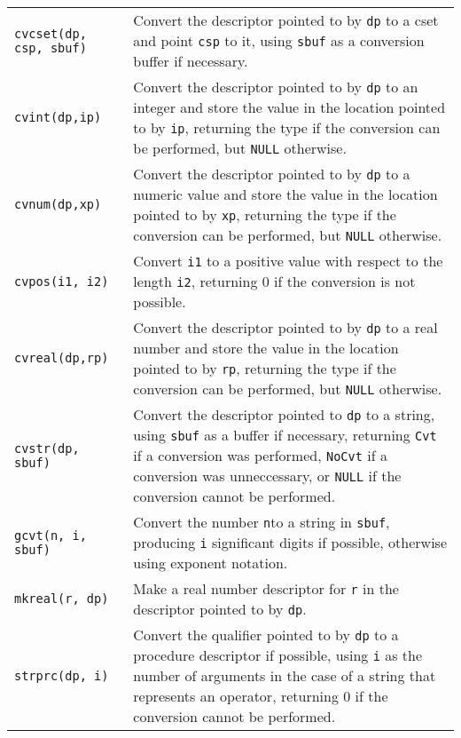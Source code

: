 \begin{xtabular}{l@{\hspace{1cm}}p{11cm}}

\texttt{\color{red}cvcset(dp, csp, sbuf)} &
Convert the descriptor pointed to by \texttt{dp} to a cset and point
\texttt{csp} to it, using \texttt{sbuf} as a conversion buffer if necessary.\\

\texttt{\color{red}cvint(dp,ip)} &
Convert the descriptor pointed to by \texttt{dp} to an integer and store the
value in the location pointed to by \texttt{ip}, returning the type if the
conversion can be performed, but \texttt{NULL} otherwise.\\

\texttt{\color{red}cvnum(dp,xp)} &
Convert the descriptor pointed to by \texttt{dp} to a numeric value and store
the value in the location pointed to by \texttt{xp}, returning the type if the
conversion can be performed, but \texttt{NULL} otherwise.\\

\texttt{cvpos(i1, i2)} &
Convert \texttt{i1} to a positive value with respect to the length \texttt{i2},
returning 0 if the conversion is not possible.\\

\texttt{\color{red}cvreal(dp,rp)} &
Convert the descriptor pointed to by \texttt{dp} to a real number and store
the value in the location pointed to by \texttt{rp}, returning the type if the
conversion can be performed, but \texttt{NULL} otherwise.\\

\texttt{\color{red}cvstr(dp, sbuf)} &
Convert the descriptor pointed to \texttt{dp} to a string, using \texttt{sbuf}
as a buffer if necessary, returning \texttt{Cvt} if a conversion was performed,
\texttt{NoCvt} if a conversion was unneccessary, or \texttt{NULL} if the
conversion cannot be performed.\\

\texttt{\color{red}gcvt(n, i, sbuf)} &
Convert the number \texttt{n}to a string in \texttt{sbuf}, producing \texttt{i}
significant digits if possible, otherwise using exponent notation.\\

\texttt{\color{red}mkreal(r, dp)} &
Make a real number descriptor for \texttt{r} in the descriptor pointed to by
\texttt{dp}.\\

\texttt{strprc(dp, i)} &
Convert the qualifier pointed to by \texttt{dp} to a procedure descriptor if
possible, using \texttt{i} as the number of arguments in the case of a string
that represents an operator, returning 0 if the conversion cannot be performed.\\

\end{xtabular}


